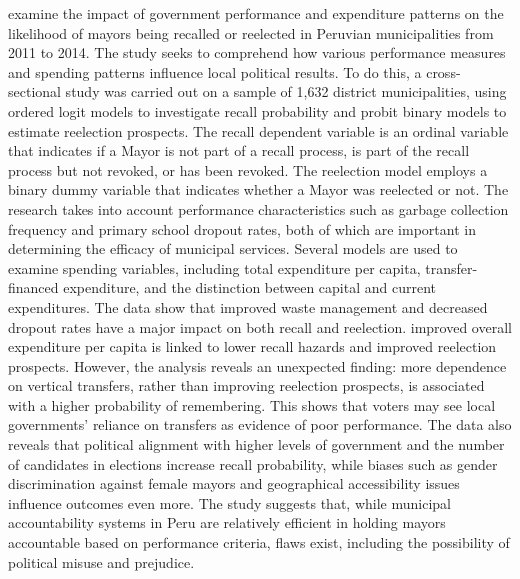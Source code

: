  examine the impact of government performance and expenditure patterns on the likelihood of mayors being recalled or reelected in Peruvian municipalities from 2011 to 2014. The study seeks to comprehend how various performance measures and spending patterns influence local political results. To do this, a cross-sectional study was carried out on a sample of 1,632 district municipalities, using ordered logit models to investigate recall probability and probit binary models to estimate reelection prospects. The recall dependent variable is an ordinal variable that indicates if a Mayor is not part of a recall process, is part of the recall process but not revoked, or has been revoked. The reelection model employs a binary dummy variable that indicates whether a Mayor was reelected or not. The research takes into account performance characteristics such as garbage collection frequency and primary school dropout rates, both of which are important in determining the efficacy of municipal services. Several models are used to examine spending variables, including total expenditure per capita, transfer-financed expenditure, and the distinction between capital and current expenditures. The data show that improved waste management and decreased dropout rates have a major impact on both recall and reelection. improved overall expenditure per capita is linked to lower recall hazards and improved reelection prospects. However, the analysis reveals an unexpected finding: more dependence on vertical transfers, rather than improving reelection prospects, is associated with a higher probability of remembering. This shows that voters may see local governments' reliance on transfers as evidence of poor performance. The data also reveals that political alignment with higher levels of government and the number of candidates in elections increase recall probability, while biases such as gender discrimination against female mayors and geographical accessibility issues influence outcomes even more. The study suggests that, while municipal accountability systems in Peru are relatively efficient in holding mayors accountable based on performance criteria, flaws exist, including the possibility of political misuse and prejudice. \\
\vspace{-9mm}
